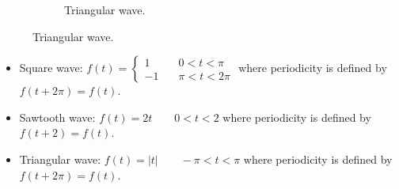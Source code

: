 \documentclass{article}
\begin{document}
\begin{figure}[H]
    \ContinuedFloat
    \centering
    \begin{subfigure}[b]{0.7\linewidth}
        \centering
        \caption{Triangular wave.}
    \end{subfigure}
\end{figure}
\begin{itemize}
    \item Square wave: $
        f(t) =
        \begin{cases}
            1  &\quad 0<t<\pi\\
            -1 &\quad \pi<t<2\pi
        \end{cases}
    $ where periodicity is defined by $f(t+2\pi)=f(t)$.
    \item Sawtooth wave: $f(t) = 2t\qquad 0<t<2$ where periodicity is defined by $f(t+2)=f(t)$.
    \item Triangular wave: $f(t) = |t|\qquad -\pi<t<\pi$ where periodicity is defined by $f(t+2\pi)=f(t)$.
\end{itemize}









\end{document}
